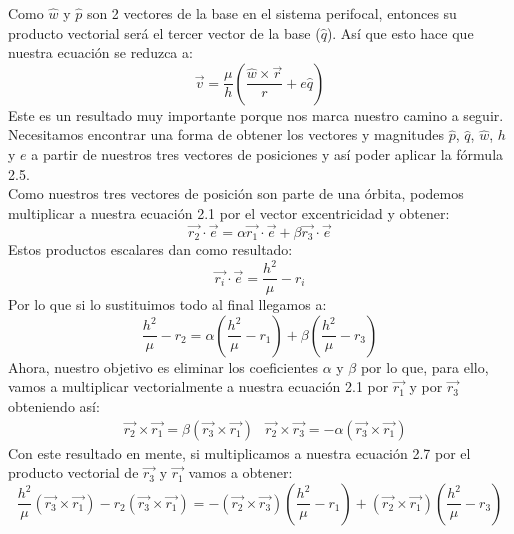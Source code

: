 \documentclass{article}
\numberwithin{equation}{section}
\begin{document}
Como $\hat{w}$ y $\hat{p}$ son 2 vectores 
de la base en el sistema perifocal, entonces su producto 
vectorial será el tercer vector de la base ($\hat{q}$). 
Así que esto hace que nuestra ecuación se reduzca a: 
\begin{equation}
    \overrightarrow{v}=\frac{\mu}{h}\left(\frac{\hat{w}\times\overrightarrow{r}}{r}+e\hat{q}\right)
\end{equation}
Este es un resultado muy importante porque nos marca nuestro 
camino a seguir. Necesitamos encontrar una forma de obtener 
los vectores y magnitudes $\hat{p}$, $\hat{q}$, 
$\hat{w}$, $h$ y $e$ a partir de nuestros tres 
vectores de posiciones y así poder aplicar la fórmula 2.5. \\

Como nuestros tres vectores de posición son parte de una 
órbita, podemos multiplicar a nuestra ecuación 2.1 por el 
vector excentricidad y obtener: 
\begin{equation*}
    \overrightarrow{r_{2}}\cdot\overrightarrow{e}=\alpha\overrightarrow{r_{1}}\cdot\overrightarrow{e}+\beta\overrightarrow{r_{3}}\cdot\overrightarrow{e}
\end{equation*} 
Estos productos escalares dan como resultado: 
\begin{equation}
    \overrightarrow{r_{i}}\cdot\overrightarrow{e}=\frac{h^{2}}{\mu}-r_{i} 
\end{equation}
Por lo que si lo sustituimos todo al final llegamos a:
\begin{equation}
    \frac{h^{2}}{\mu}-r_{2}=\alpha\left(\frac{h^{2}}{\mu}-r_{1}\right)+\beta\left(\frac{h^{2}}{\mu}-r_{3}\right)
\end{equation}
Ahora, nuestro objetivo es eliminar los coeficientes $\alpha$ 
y $\beta$ por lo que, para ello, vamos a multiplicar vectorialmente 
a nuestra ecuación 2.1 por $\overrightarrow{r_{1}}$ y 
por $\overrightarrow{r_{3}}$ obteniendo así:
\begin{align*}
    &\overrightarrow{r_{2}}\times\overrightarrow{r_1}=\beta(\overrightarrow{r_{3}}\times\overrightarrow{r_{1}})   &\overrightarrow{r_{2}}\times\overrightarrow{r_3}=-\alpha(\overrightarrow{r_{3}}\times\overrightarrow{r_{1}})
\end{align*}
Con este resultado en mente, si multiplicamos a nuestra ecuación 
2.7 por el producto vectorial de $\overrightarrow{r_3}$ y 
$\overrightarrow{r_1}$ vamos a obtener:
\begin{equation*}
    \frac{h^{2}}{\mu}(\overrightarrow{r_{3}}\times\overrightarrow{r_{1}})-r_{2}(\overrightarrow{r_{3}}\times\overrightarrow{r_{1}})=-(\overrightarrow{r_{2}}\times\overrightarrow{r_{3}})\left(\frac{h^{2}}{\mu}-r_{1} \right)+(\overrightarrow{r_{2}}\times\overrightarrow{r_{1}})\left(\frac{h^{2}}{\mu}-r_{3} \right)
\end{equation*}
\end{document}
